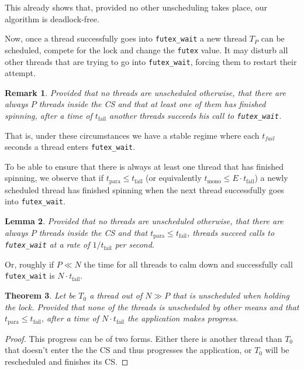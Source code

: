 \documentclass{sig-alternate-05-2015}
\newtheorem{remark}{Remark}[section]
\newtheorem{lemma}[remark]{Lemma}
\newtheorem{theorem}[remark]{Theorem}
\begin{document}
This already shows that, provided no other unscheduling takes
place, our algorithm is deadlock-free.

Now, once a thread successfully goes into \texttt{futex\_wait} a new
thread $T_P$ can be scheduled, compete for the lock and change the
\texttt{futex} value. It may disturb all other threads that are trying to
go into \texttt{futex\_wait}, forcing them to restart their attempt.

\begin{remark}
Provided that no threads are unscheduled otherwise, that there are
always $P$ threads inside the CS and that at least one of them has
finished spinning, after a time of $t_{\textrm{fail}}$ another
threads succeeds his call to \texttt{futex\_wait}.
\end{remark}

That is, under these circumstances we have a stable regime where each
$t_{fail}$ seconds a thread enters \texttt{futex\_wait}.

To be able to ensure that there is always at least one thread that
has finished spinning, we observe that if $t_{\textrm{para}} \leq
    t_{\textrm{fail}}$ (or equivalently $t_{\textrm{mono}} \leq E\cdot
    t_{\textrm{fail}}$) a newly scheduled thread has finished spinning
when the next thread successfully goes into \texttt{futex\_wait}.

\begin{lemma}
Provided that no threads are unscheduled otherwise, that there are
always $P$ threads inside the CS and that $t_{\textrm{para}} \leq
    t_{\textrm{fail}}$, threads succeed calls to \texttt{futex\_wait} at a rate of
$1/t_{\textrm{fail}}$ per second.
\end{lemma}

Or, roughly if $P \ll N$ the time for all threads to calm down and
successfully call \texttt{futex\_wait} is $N\cdot t_{\textrm{fail}}$.

\begin{theorem}
Let be $T_0$ a thread out of $N \gg P$ that is unscheduled when
holding the lock.  Provided that none of the threads is
unscheduled by other means and that $t_{\textrm{para}} \leq
    t_{\textrm{fail}}$, after a time of $N\cdot t_{\textrm{fail}}$ the
application makes progress.
\end{theorem}

\begin{proof}
This progress can be of two forms.  Either there is another thread
than $T_{0}$ that doesn't enter the the CS and thus
progresses the application, or $T_0$ will be rescheduled and
finishes its CS.
\end{proof}
\end{document}
